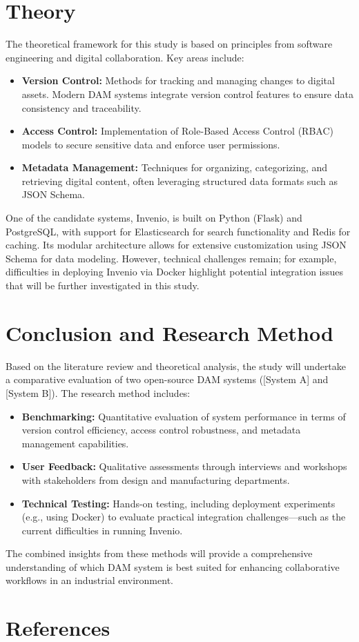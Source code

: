 \documentclass[a4paper,12pt,twocolumn]{article}
\begin{document}
\section{Theory}
The theoretical framework for this study is based on principles from software engineering and digital collaboration. Key areas include:
\begin{itemize}
    \item \textbf{Version Control:} Methods for tracking and managing changes to digital assets. Modern DAM systems integrate version control features to ensure data consistency and traceability.
    \item \textbf{Access Control:} Implementation of Role-Based Access Control (RBAC) models to secure sensitive data and enforce user permissions.
    \item \textbf{Metadata Management:} Techniques for organizing, categorizing, and retrieving digital content, often leveraging structured data formats such as JSON Schema.
\end{itemize}
One of the candidate systems, Invenio, is built on Python (Flask) and PostgreSQL, with support for Elasticsearch for search functionality and Redis for caching. Its modular architecture allows for extensive customization using JSON Schema for data modeling. However, technical challenges remain; for example, difficulties in deploying Invenio via Docker highlight potential integration issues that will be further investigated in this study.

\section{Conclusion and Research Method}
Based on the literature review and theoretical analysis, the study will undertake a comparative evaluation of two open-source DAM systems ([System A] and [System B]). The research method includes:
\begin{itemize}
    \item \textbf{Benchmarking:} Quantitative evaluation of system performance in terms of version control efficiency, access control robustness, and metadata management capabilities.
    \item \textbf{User Feedback:} Qualitative assessments through interviews and workshops with stakeholders from design and manufacturing departments.
    \item \textbf{Technical Testing:} Hands-on testing, including deployment experiments (e.g., using Docker) to evaluate practical integration challenges—such as the current difficulties in running Invenio.
\end{itemize}
The combined insights from these methods will provide a comprehensive understanding of which DAM system is best suited for enhancing collaborative workflows in an industrial environment.

\section{References}

\end{document}

